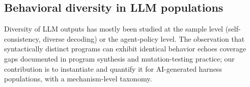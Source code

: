 \subsection{Behavioral diversity in LLM populations}\label{related:diversity}
Diversity of LLM outputs has mostly been studied at the sample level
(self-consistency, diverse decoding) or the agent-policy level. The
observation that syntactically distinct programs can exhibit identical
behavior echoes coverage gaps documented in program synthesis and
mutation-testing practice; our contribution is to instantiate and quantify
it for AI-generated harness populations, with a mechanism-level taxonomy.

